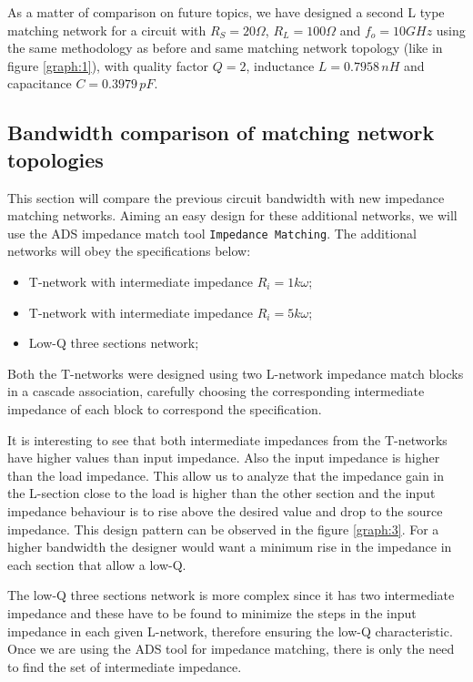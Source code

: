 As a matter of comparison on future topics, we have designed a second L type matching network for a circuit with $R_S=20 \Omega$, $R_L=100 \Omega$ and $f_o = 10 GHz$ using the same methodology as before and same matching network topology (like in figure \ref{graph:1}), with quality factor $Q = 2$, inductance $L = 0.7958 \, nH$ and capacitance $C = 0.3979 \, pF$.

\subsection{Bandwidth comparison of matching network topologies}

This section will compare the previous circuit bandwidth with new impedance matching networks. Aiming an easy design for these additional networks, we will use the ADS impedance match tool \texttt{Impedance Matching}. The additional networks will obey the specifications below:

\begin{itemize}
    \item T-network with intermediate impedance $R_i = 1 k \omega$;
    \item T-network with intermediate impedance $R_i = 5 k \omega$;
    \item Low-Q three sections network;
\end{itemize}

Both the T-networks were designed using two L-network impedance match blocks in a cascade association, carefully choosing the corresponding intermediate impedance of each block to correspond the specification.

It is interesting to see that both intermediate impedances from the T-networks have higher values than input impedance. Also the input impedance is higher than the load impedance. This allow us to analyze that the impedance gain in the L-section close to the load is higher than the other section and the input impedance behaviour is to rise above the desired value and drop to the source impedance. This design pattern can be observed in the figure \ref{graph:3}. For a higher bandwidth the designer would want a minimum rise in the impedance in each section that allow a low-Q.



The low-Q three sections network is more complex since it has two intermediate impedance and these have to be found to minimize the steps in the input impedance in each given L-network, therefore ensuring the low-Q characteristic. Once we are using the ADS tool for impedance matching, there is only the need to find the set of intermediate impedance. 


